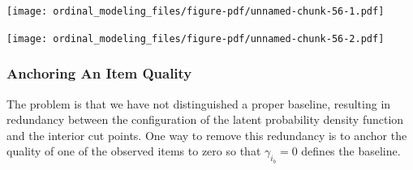 \documentclass[
  letterpaper,
  DIV=11,
  numbers=noendperiod]{scrartcl}
\newenvironment{Shaded}{\begin{snugshade}}{\end{snugshade}}
\newcommand{\FunctionTok}[1]{\textcolor[rgb]{0.28,0.35,0.67}{#1}}
\newcommand{\NormalTok}[1]{\textcolor[rgb]{0.00,0.23,0.31}{#1}}
\newcommand{\SpecialCharTok}[1]{\textcolor[rgb]{0.37,0.37,0.37}{#1}}
\newcommand{\StringTok}[1]{\textcolor[rgb]{0.13,0.47,0.30}{#1}}
\begin{document}
\texttt{[image: ordinal\_modeling\_files/figure-pdf/unnamed-chunk-56-1.pdf]}

\begin{Shaded}
\end{Shaded}

\texttt{[image: ordinal\_modeling\_files/figure-pdf/unnamed-chunk-56-2.pdf]}

\subsubsection{Anchoring An Item
Quality}\label{anchoring-an-item-quality}

The problem is that we have not distinguished a proper baseline,
resulting in redundancy between the configuration of the latent
probability density function and the interior cut points. One way to
remove this redundancy is to anchor the quality of one of the observed
items to zero so that \(\gamma_{i_{b}} = 0\) defines the baseline.
\end{document}
